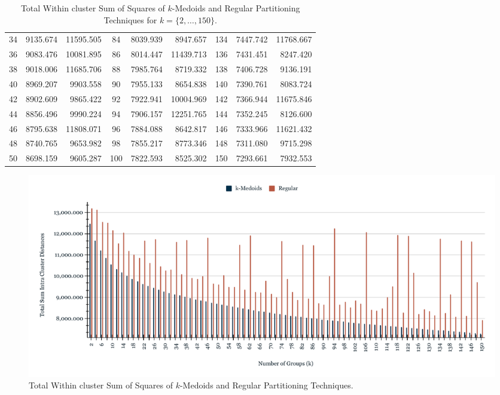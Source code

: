 \begin{table}[h]
\begin{tabular}{|c|r|r|c|r|r|c|r|r|}
		34 &  9135.674 & 11595.505 &  84 & 8039.939 &  8947.657 & 134 & 7447.742 & 11768.667 \\
		36 &  9083.476 & 10081.895 &  86 & 8014.447 & 11439.713 & 136 & 7431.451 &  8247.420 \\
		38 &  9018.006 & 11685.706 &  88 & 7985.764 &  8719.332 & 138 & 7406.728 &  9136.191 \\
		40 &  8969.207 &  9903.558 &  90 & 7955.133 &  8654.838 & 140 & 7390.761 &  8083.724 \\
		42 &  8902.609 &  9865.422 &  92 & 7922.941 & 10004.969 & 142 & 7366.944 & 11675.846 \\
		44 &  8856.496 &  9990.224 &  94 & 7906.157 & 12251.765 & 144 & 7352.245 &  8126.600 \\
		46 &  8795.638 & 11808.071 &  96 & 7884.088 &  8642.817 & 146 & 7333.966 & 11621.432 \\
		48 &  8740.765 &  9653.982 &  98 & 7855.217 &  8773.346 & 148 & 7311.080 &  9715.298 \\
		50 &  8698.159 &  9605.287 & 100 & 7822.593 &  8525.302 & 150 & 7293.661 &  7932.553 \\ \hline
		
	\end{tabular}
	\caption{Total Within cluster Sum of Squares of $k$-Medoids and Regular Partitioning Techniques for $k = \{2, \ldots, 150\}$.}
	\label{Table:TotalSumRegularkMedoids}
\end{table}


\begin{figure}[h]
	\centering
	\includegraphics[scale=0.46]{../Figures/Scaled-TotalSum-RegularKmedoids}
	\caption{Total Within cluster Sum of Squares of $k$-Medoids and Regular Partitioning Techniques.}
	\label{Fig:TotalSum-RegularKmedoids}
\end{figure}

